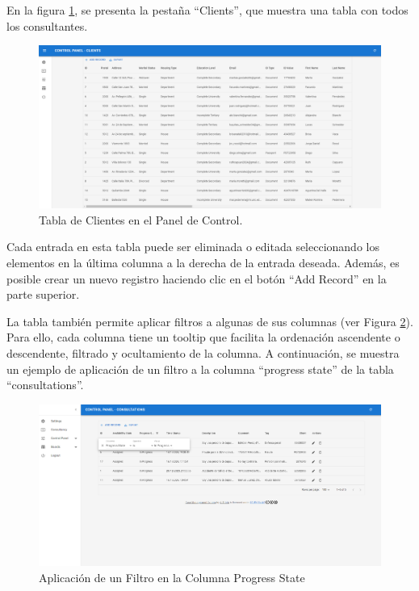 En la figura \ref{fig:clients-table}, se presenta la pestaña ``Clients'', que muestra una tabla con todos los consultantes.

\begin{figure}[H]
    \centering
    \includegraphics[width=1\linewidth]{fig/clients-real-page.png}
    \caption{Tabla de Clientes en el Panel de Control.}
    \label{fig:clients-table}
\end{figure}

Cada entrada en esta tabla puede ser eliminada o editada seleccionando los elementos en la última columna a la derecha de la entrada deseada. Además, es posible crear un nuevo registro haciendo clic en el botón ``Add Record'' en la parte superior.

La tabla también permite aplicar filtros a algunas de sus columnas (ver Figura \ref{fig:tabla-filtro-ejemplo}). Para ello, cada columna tiene un tooltip que facilita la ordenación ascendente o descendente, filtrado y ocultamiento de la columna. A continuación, se muestra un ejemplo de aplicación de un filtro a la columna ``progress state'' de la tabla ``consultations''.

\begin{figure}[H]
    \centering
    \includegraphics[width=1\linewidth]{fig/tabla-filter.png}
    \caption{Aplicación de un Filtro en la Columna Progress State}
    \label{fig:tabla-filtro-ejemplo}
\end{figure}



